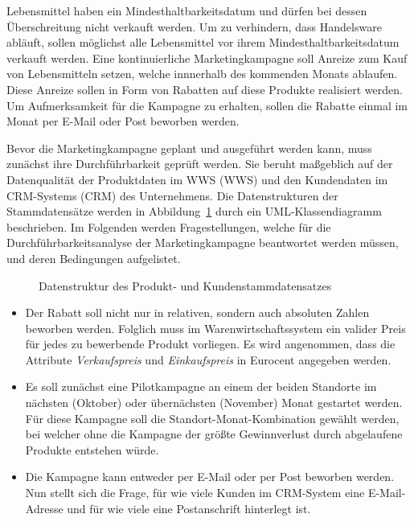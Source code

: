 \documentclass[
  language=german, %
  type=bachelor,%
  ngerman
]{isthesis}
\begin{document}
\begin{content}
  Lebensmittel haben ein Mindesthaltbarkeitsdatum und dürfen bei dessen
  Überschreitung nicht verkauft werden. Um zu verhindern, dass Handelsware
  abläuft, sollen möglichst alle Lebensmittel vor ihrem
  Mindesthaltbarkeitsdatum verkauft werden. Eine kontinuierliche
  Marketingkampagne soll Anreize zum Kauf von Lebensmitteln setzen, welche
  innnerhalb des kommenden Monats ablaufen. Diese Anreize sollen in Form von
  Rabatten auf diese Produkte realisiert werden. Um Aufmerksamkeit für die
  Kampagne zu erhalten, sollen die Rabatte einmal im Monat per E-Mail oder Post
  beworben werden. 

  Bevor die Marketingkampagne geplant und ausgeführt werden kann, muss zunächst
  ihre Durchführbarkeit geprüft werden. Sie beruht maßgeblich auf der
  Datenqualität der Produktdaten im \acrlong{WWS} (\acrshort{WWS}) und den
  Kundendaten im \acrlong{CRM}-Systems (\acrshort{CRM}) des Unternehmens. Die
  Datenstrukturen der Stammdatensätze werden in
  Abbildung~\ref{example-use-case-data} durch ein UML-Klassendiagramm
  beschrieben. Im Folgenden werden Fragestellungen, welche für die
  Durchführbarkeitsanalyse der Marketingkampagne beantwortet werden müssen, und
  deren Bedingungen aufgelistet.

  \begin{figure}
    \resizebox{250pt}{!}{}
    \caption{Datenstruktur des Produkt- und Kundenstammdatensatzes}\label{example-use-case-data}
  \end{figure}

  \begin{itemize}

    \item Der Rabatt soll nicht nur in relativen, sondern auch absoluten Zahlen
      beworben werden. Folglich muss im Warenwirtschaftssystem ein valider
      Preis für jedes zu bewerbende Produkt vorliegen. Es wird angenommen, dass
      die Attribute \textit{Verkaufspreis} und \textit{Einkaufspreis} in
      Eurocent angegeben werden.

    \item Es soll zunächst eine Pilotkampagne an einem der beiden Standorte im
      nächsten (Oktober) oder übernächsten (November) Monat gestartet werden.
      Für diese Kampagne soll die Standort-Monat-Kombination gewählt werden,
      bei welcher ohne die Kampagne der größte Gewinnverlust durch abgelaufene
      Produkte entstehen würde.

    \item Die Kampagne kann entweder per E-Mail oder per Post beworben werden.
      Nun stellt sich die Frage, für wie viele Kunden im \acrshort{CRM}-System
      eine E-Mail-Adresse und für wie viele eine Postanschrift hinterlegt ist.


\end{itemize}
\end{content}
\end{document}
